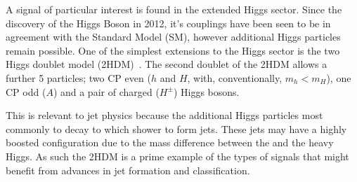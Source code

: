 A signal of particular interest is found in the extended Higgs sector.
Since the discovery of the Higgs Boson in 2012, it's couplings
have been seen to be in agreement with the Standard Model (SM),
however additional Higgs particles remain possible.
One of the simplest extensions to the Higgs sector is the two Higgs doublet model (2HDM)~\cite{Branco2012THDM}.
The second doublet of the 2HDM allows a further 5 particles;
two CP even (\(h\) and \(H\), with, conventionally, \(m_h < m_H\)),
one CP odd (\(A\))
and a pair of charged (\(H^\pm\)) Higgs bosons.

This is relevant to jet physics because the additional Higgs particles most commonly to decay to  which shower to form jets.
These jets may have a highly boosted configuration due to the mass difference between the  and the heavy Higgs.
As such the 2HDM is a prime example of the types of signals that might benefit from advances in jet formation and classification.

